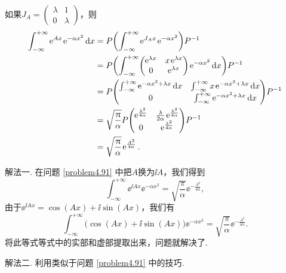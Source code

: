 \begin{solution}
  如果$J_A=\begin{pmatrix}
    \lambda & 1 \\
    0 & \lambda
  \end{pmatrix}$，则
  \begin{align*}
    \int_{-\infty}^{+\infty} \ee^{Ax} \ee^{-\alpha x^2} \dif x & = P \left( \int_{-\infty}^{+\infty} \ee^{J_Ax}\ee^{-\alpha x^2} \right) P^{-1} \\
    & = P \left( \int_{-\infty}^{+\infty} \begin{pmatrix}
      \ee^{\lambda x} & x\ee^{\lambda x} \\
      0 & \ee^{\lambda x}
    \end{pmatrix}\ee^{-\alpha x^2}\dif x \right) P^{-1} \\
    & = P \begin{pmatrix}
      \int_{-\infty}^{+\infty} \ee^{-\alpha x^2+\lambda x}\dif x & \int_{-\infty}^{+\infty} x\ee^{-\alpha x^2+\lambda x}\dif x  \\
      0 & \int_{-\infty}^{+\infty} \ee^{-\alpha x^2+\lambda x}\dif x
    \end{pmatrix} P^{-1} \\
    & = \sqrt{\frac\pi\alpha} P \begin{pmatrix}
      \ee^{\frac{\lambda^2}{4\alpha}} & \frac\lambda{2\alpha}\ee^{\frac{\lambda^2}{4\alpha}}\\
      0 & \ee^{\frac{\lambda^2}{4\alpha}}
    \end{pmatrix}P^{-1} \\
    & = \sqrt{\frac\pi\alpha}\ee^{\frac{A^2}{4\alpha}}.
  \end{align*}
\end{solution}

\begin{solution}
  {\kaishu 解法一.} 在问题 \ref{problem4.91} 中把$A$换为$\ii A$，我们得到
  \[
    \int_{-\infty}^{+\infty} \ee^{\ii Ax} \ee^{-\alpha x^2} = \sqrt{\frac\pi\alpha} \ee^{-\frac{A^2}{4\alpha}},
  \]
  由于$\ee^{\ii Ax}=\cos(Ax)+\ii\sin(Ax)$，我们有
  \[
    \int_{-\infty}^{+\infty} \big( \cos(Ax) + \ii\sin (Ax) \big) \ee^{-\alpha x^2} = \sqrt{\frac\pi\alpha} \ee^{-\frac{A^2}{4\alpha}}.
  \]
  将此等式等式中的实部和虚部提取出来，问题就解决了.

  {\kaishu 解法二.} 利用类似于问题 \ref{problem4.91} 中的技巧.
\end{solution}

